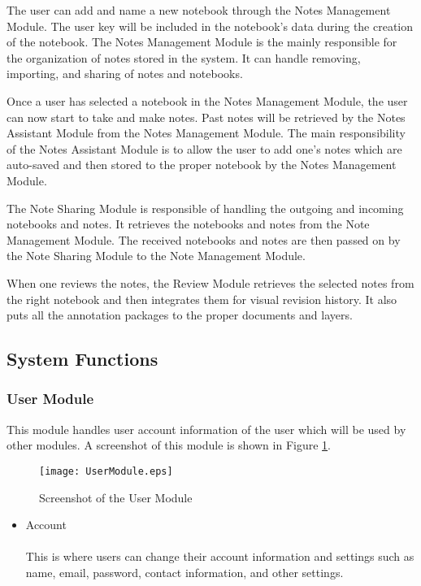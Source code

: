 The user can add and name a new notebook through the Notes Management Module. The user key will be included in the notebook's data during the creation of the notebook. The Notes Management Module is the mainly responsible for the organization of notes stored in the system. It can handle removing, importing, and sharing of notes and notebooks.

Once a user has selected a notebook in the Notes Management Module, the user can now start to take and make notes. Past notes will be retrieved by the Notes Assistant Module from the Notes Management Module. The main responsibility of the Notes Assistant Module is to allow the user to add one's notes which are auto-saved and then stored to the proper notebook by the Notes Management Module.

The Note Sharing Module is responsible of handling the outgoing and incoming notebooks and notes. It retrieves the notebooks and notes from the Note Management Module. The received notebooks and notes are then passed on by the Note Sharing Module to the Note Management Module.

When one reviews the notes, the Review Module retrieves the selected notes from the right notebook and then integrates them for visual revision history. It also puts all the annotation packages to the proper documents and layers.

\subsection{System Functions}
\label{sec:systemfunctions}

\subsubsection{User Module}
\label{sec:usermodule}

This module handles user account information of the user which will be used by other modules. A screenshot of this module is shown in Figure \ref{fig:usermodule}.

\begin{figure}[htbp!]
   \centering
   \texttt{[image: UserModule.eps]}
   \caption{Screenshot of the User Module}
   \label{fig:usermodule}
\end{figure}

\begin{itemize}
\item Account
\\\\This is where users can change their account information and settings such as name, email, password, contact information, and other settings.
\end{itemize}

